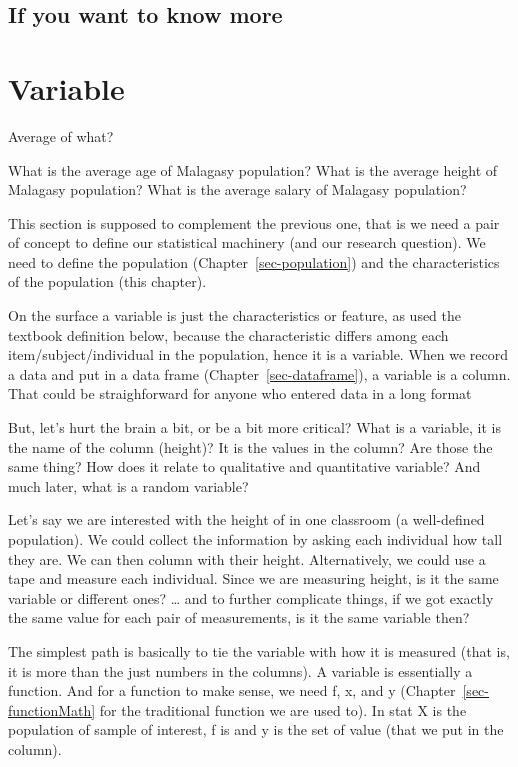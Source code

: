 \documentclass[
  letterpaper,
  DIV=11,
  numbers=noendperiod]{scrreprt}
\begin{document}
\section*{If you want to know more}\label{if-you-want-to-know-more}


\chapter{Variable}\label{sec-variable}

Average of what?

What is the average age of Malagasy population? What is the average
height of Malagasy population? What is the average salary of Malagasy
population?

This section is supposed to complement the previous one, that is we need
a pair of concept to define our statistical machinery (and our research
question). We need to define the population
(Chapter~\ref{sec-population}) and the characteristics of the population
(this chapter).

On the surface a variable is just the characteristics or feature, as
used the textbook definition below, because the characteristic differs
among each item/subject/individual in the population, hence it is a
variable. When we record a data and put in a data frame
(Chapter~\ref{sec-dataframe}), a variable is a column. That could be
straighforward for anyone who entered data in a long format

But, let's hurt the brain a bit, or be a bit more critical? What is a
variable, it is the name of the column (height)? It is the values in the
column? Are those the same thing? How does it relate to qualitative and
quantitative variable? And much later, what is a random variable?

Let's say we are interested with the height of in one classroom (a
well-defined population). We could collect the information by asking
each individual how tall they are. We can then column with their height.
Alternatively, we could use a tape and measure each individual. Since we
are measuring height, is it the same variable or different ones?
\ldots{} and to further complicate things, if we got exactly the same
value for each pair of measurements, is it the same variable then?

The simplest path is basically to tie the variable with how it is
measured (that is, it is more than the just numbers in the columns). A
variable is essentially a function. And for a function to make sense, we
need f, x, and y (Chapter~\ref{sec-functionMath} for the traditional
function we are used to). In stat X is the population of sample of
interest, f is and y is the set of value (that we put in the column).
\end{document}
